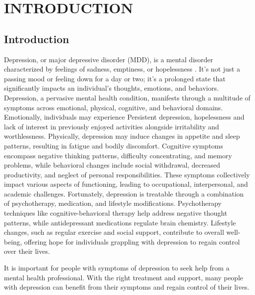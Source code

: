 \chapter{INTRODUCTION}
\label{chap:intro}
\section{Introduction}
Depression, or major depressive disorder (MDD), is a mental disorder characterized by feelings of sadness, emptiness, or hopelessness \cite{islam2018depression}. It's not just a passing mood or feeling down for a day or two; it's a prolonged state that significantly impacts an individual's thoughts, emotions, and behaviors.
\\
Depression, a pervasive mental health condition, manifests through a multitude of symptoms across emotional, physical, cognitive, and behavioral domains. Emotionally, individuals may experience Persistent depression, hopelessness and lack of interest in previously enjoyed activities alongside irritability and worthlessness. Physically, depression may induce changes in appetite and sleep patterns, resulting in fatigue and bodily discomfort. Cognitive symptoms encompass negative thinking patterns, difficulty concentrating, and memory problems, while behavioral changes include social withdrawal, decreased productivity, and neglect of personal responsibilities. These symptoms collectively impact various aspects of functioning, leading to occupational, interpersonal, and academic challenges. Fortunately, depression is treatable through a combination of psychotherapy, medication, and lifestyle modifications. Psychotherapy techniques like cognitive-behavioral therapy help address negative thought patterns, while antidepressant medications regulate brain chemistry. Lifestyle changes, such as regular exercise and social support, contribute to overall well-being, offering hope for individuals grappling with depression to regain control over their lives.

It is important for people with symptoms of depression to seek help from a mental health professional. With the right treatment and support, many people with depression can benefit from their symptoms and regain control of their lives.
